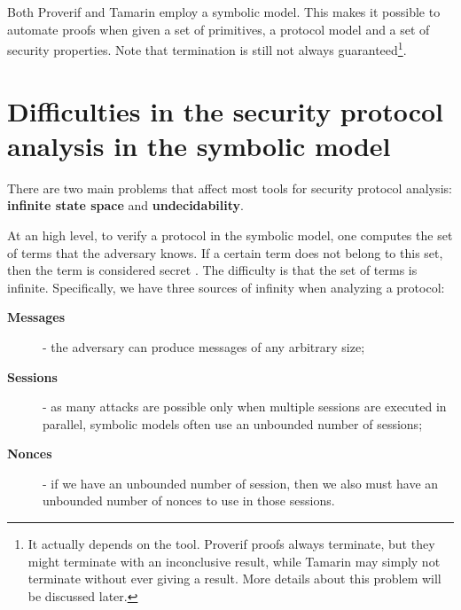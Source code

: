 Both Proverif and Tamarin employ a symbolic model. This makes it possible to automate proofs when given a set of primitives, a protocol model and a set of security properties. Note that termination is still not always guaranteed\footnote{It actually depends on the tool. Proverif proofs always terminate, but they might terminate with an inconclusive result, while Tamarin may simply not terminate without ever giving a result. More details about this problem will be discussed later.}. %

\section{Difficulties in the security protocol analysis in the symbolic model}
There are two main problems that affect most tools for security protocol analysis: \textbf{infinite state space} and \textbf{undecidability}.

At an high level, to verify a protocol in the symbolic model, one computes the set of terms that the adversary knows. If a certain term does not belong to this set, then the term is considered secret \cite{SymbolicVerificationBlanchet}. The difficulty is that the set of terms is infinite. Specifically, we have three sources of infinity when analyzing a protocol:
\begin{description}
    \item[\textbf{Messages}] - the adversary can produce messages of any arbitrary size;
    \item[\textbf{Sessions}] - as many attacks are possible only when multiple sessions are executed in parallel, symbolic models often use an unbounded number of sessions;
    \item[\textbf{Nonces}] - if we have an unbounded number of session, then we also must have an unbounded number of nonces to use in those sessions.
\end{description}

